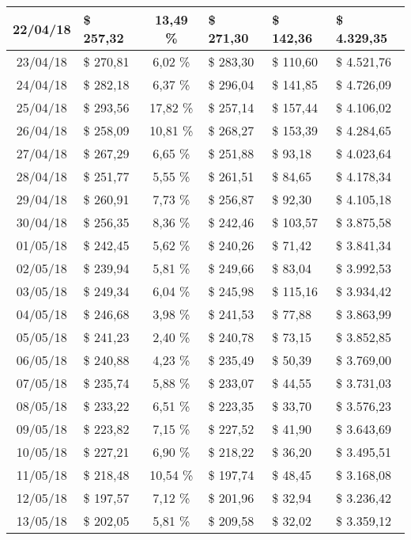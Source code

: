 \begin{center}
\begin{small}
\begin{longtable}{|c|l|c|l|l|l|}
22/04/18 & \$ 257,32 & 13,49 \% & \$ 271,30 & \$ 142,36 & \$ 4.329,35 \\ \hline
23/04/18 & \$ 270,81 & 6,02 \% & \$ 283,30 & \$ 110,60 & \$ 4.521,76 \\ \hline
24/04/18 & \$ 282,18 & 6,37 \% & \$ 296,04 & \$ 141,85 & \$ 4.726,09 \\ \hline
25/04/18 & \$ 293,56 & 17,82 \% & \$ 257,14 & \$ 157,44 & \$ 4.106,02 \\ \hline
26/04/18 & \$ 258,09 & 10,81 \% & \$ 268,27 & \$ 153,39 & \$ 4.284,65 \\ \hline
27/04/18 & \$ 267,29 & 6,65 \% & \$ 251,88 & \$ 93,18 & \$ 4.023,64 \\ \hline
28/04/18 & \$ 251,77 & 5,55 \% & \$ 261,51 & \$ 84,65 & \$ 4.178,34 \\ \hline
29/04/18 & \$ 260,91 & 7,73 \% & \$ 256,87 & \$ 92,30 & \$ 4.105,18 \\ \hline
30/04/18 & \$ 256,35 & 8,36 \% & \$ 242,46 & \$ 103,57 & \$ 3.875,58 \\ \hline
01/05/18 & \$ 242,45 & 5,62 \% & \$ 240,26 & \$ 71,42 & \$ 3.841,34 \\ \hline
02/05/18 & \$ 239,94 & 5,81 \% & \$ 249,66 & \$ 83,04 & \$ 3.992,53 \\ \hline
03/05/18 & \$ 249,34 & 6,04 \% & \$ 245,98 & \$ 115,16 & \$ 3.934,42 \\ \hline
04/05/18 & \$ 246,68 & 3,98 \% & \$ 241,53 & \$ 77,88 & \$ 3.863,99 \\ \hline
05/05/18 & \$ 241,23 & 2,40 \% & \$ 240,78 & \$ 73,15 & \$ 3.852,85 \\ \hline
06/05/18 & \$ 240,88 & 4,23 \% & \$ 235,49 & \$ 50,39 & \$ 3.769,00 \\ \hline
07/05/18 & \$ 235,74 & 5,88 \% & \$ 233,07 & \$ 44,55 & \$ 3.731,03 \\ \hline
08/05/18 & \$ 233,22 & 6,51 \% & \$ 223,35 & \$ 33,70 & \$ 3.576,23 \\ \hline
09/05/18 & \$ 223,82 & 7,15 \% & \$ 227,52 & \$ 41,90 & \$ 3.643,69 \\ \hline
10/05/18 & \$ 227,21 & 6,90 \% & \$ 218,22 & \$ 36,20 & \$ 3.495,51 \\ \hline
11/05/18 & \$ 218,48 & 10,54 \% & \$ 197,74 & \$ 48,45 & \$ 3.168,08 \\ \hline
12/05/18 & \$ 197,57 & 7,12 \% & \$ 201,96 & \$ 32,94 & \$ 3.236,42 \\ \hline
13/05/18 & \$ 202,05 & 5,81 \% & \$ 209,58 & \$ 32,02 & \$ 3.359,12 \\ \hline

\end{longtable}
\end{small}
\end{center}
